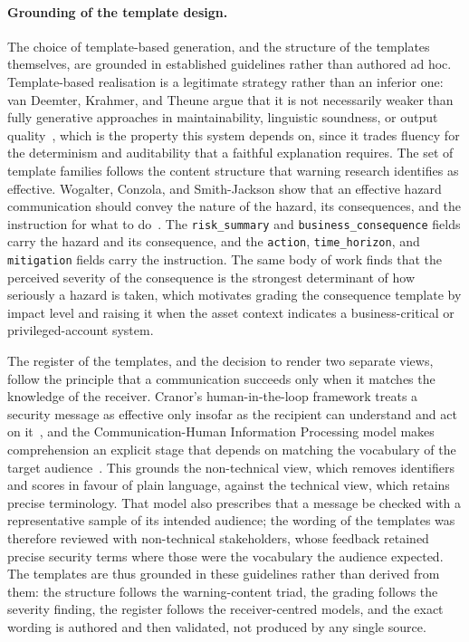 \paragraph{Grounding of the template design.} The choice of template-based generation, and the structure of the templates themselves, are grounded in established guidelines rather than authored ad hoc. Template-based realisation is a legitimate strategy rather than an inferior one: van Deemter, Krahmer, and Theune argue that it is not necessarily weaker than fully generative approaches in maintainability, linguistic soundness, or output quality~\cite{vandeemter2005template}, which is the property this system depends on, since it trades fluency for the determinism and auditability that a faithful explanation requires. The set of template families follows the content structure that warning research identifies as effective. Wogalter, Conzola, and Smith-Jackson show that an effective hazard communication should convey the nature of the hazard, its consequences, and the instruction for what to do~\cite{wogalter2002guidelines}. The \texttt{risk\_summary} and \texttt{business\_consequence} fields carry the hazard and its consequence, and the \texttt{action}, \texttt{time\_horizon}, and \texttt{mitigation} fields carry the instruction. The same body of work finds that the perceived severity of the consequence is the strongest determinant of how seriously a hazard is taken, which motivates grading the consequence template by impact level and raising it when the asset context indicates a business-critical or privileged-account system.

The register of the templates, and the decision to render two separate views, follow the principle that a communication succeeds only when it matches the knowledge of the receiver. Cranor's human-in-the-loop framework treats a security message as effective only insofar as the recipient can understand and act on it~\cite{cranor2008humanloop}, and the Communication-Human Information Processing model makes comprehension an explicit stage that depends on matching the vocabulary of the target audience~\cite{wogalter2006chip}. This grounds the non-technical view, which removes identifiers and scores in favour of plain language, against the technical view, which retains precise terminology. That model also prescribes that a message be checked with a representative sample of its intended audience; the wording of the templates was therefore reviewed with non-technical stakeholders, whose feedback retained precise security terms where those were the vocabulary the audience expected. The templates are thus grounded in these guidelines rather than derived from them: the structure follows the warning-content triad, the grading follows the severity finding, the register follows the receiver-centred models, and the exact wording is authored and then validated, not produced by any single source.


